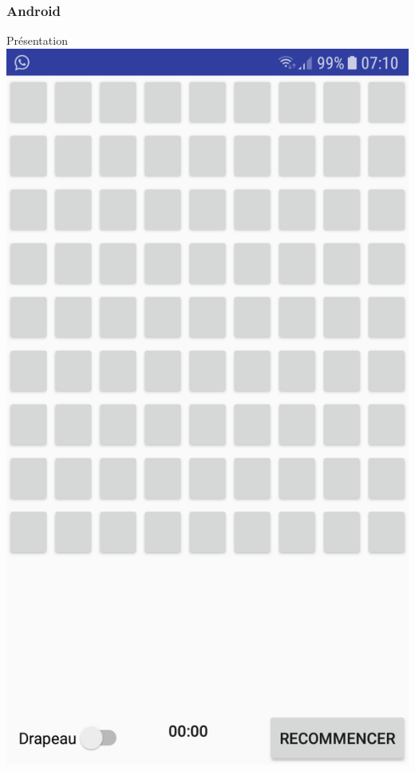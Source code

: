 \documentclass{beamer}
\begin{document}
\begin{frame}
\frametitle{Android}
\begin{block}{Présentation}
    \includegraphics[scale=0.15]{Images/1.png}

\end{block}
\end{frame}
\end{document}
